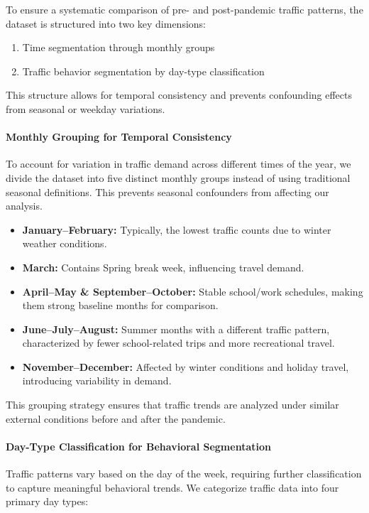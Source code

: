 \documentclass{article}
\begin{document}
To ensure a systematic comparison of pre- and post-pandemic traffic patterns, the dataset is structured into two key dimensions:
\begin{enumerate}
    \item Time segmentation through monthly groups
    \item Traffic behavior segmentation by day-type classification
\end{enumerate}

This structure allows for temporal consistency and prevents confounding effects from seasonal or weekday variations.

\paragraph{Monthly Grouping for Temporal Consistency}

To account for variation in traffic demand across different times of the year, we divide the dataset into five distinct monthly groups instead of using traditional seasonal definitions. This prevents seasonal confounders from affecting our analysis.

\begin{itemize}
    \item \textbf{January–February:} Typically, the lowest traffic counts due to winter weather conditions.
    \item \textbf{March:} Contains Spring break week, influencing travel demand.
    \item \textbf{April–May \& September–October:} Stable school/work schedules, making them strong baseline months for comparison.
    \item \textbf{June–July–August:} Summer months with a different traffic pattern, characterized by fewer school-related trips and more recreational travel.
    \item \textbf{November–December:} Affected by winter conditions and holiday travel, introducing variability in demand.
\end{itemize}

This grouping strategy ensures that traffic trends are analyzed under similar external conditions before and after the pandemic.

\paragraph{Day-Type Classification for Behavioral Segmentation}

Traffic patterns vary based on the day of the week, requiring further classification to capture meaningful behavioral trends. We categorize traffic data into four primary day types:
\end{document}
